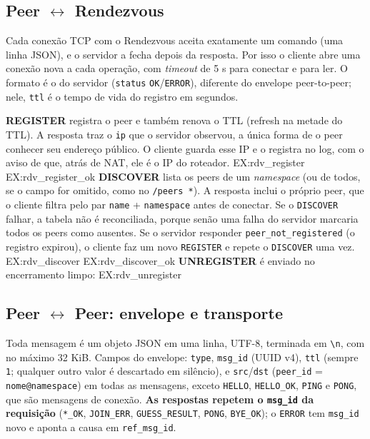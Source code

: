 \documentclass[11pt,a4paper]{article}
\begin{document}
\subsection{Peer \texorpdfstring{$\leftrightarrow$}{<->} Rendezvous}\label{sec:rdv}
Cada conexão TCP com o Rendezvous aceita exatamente um comando (uma linha JSON), e o servidor a fecha depois da resposta. Por isso o cliente abre uma conexão nova a cada operação, com \emph{timeout} de 5 s para conectar e para ler. O formato é o do servidor (\texttt{status} \texttt{OK}/\texttt{ERROR}), diferente do envelope peer-to-peer; nele, \texttt{ttl} é o tempo de vida do registro em segundos.

\textbf{REGISTER} registra o peer e também renova o TTL (refresh na metade do TTL). A resposta traz o \texttt{ip} que o servidor observou, a única forma de o peer conhecer seu endereço público. O cliente guarda esse IP e o registra no log, com o aviso de que, atrás de NAT, ele é o IP do roteador.
{{EX:rdv_register}}
{{EX:rdv_register_ok}}
\textbf{DISCOVER} lista os peers de um \emph{namespace} (ou de todos, se o campo for omitido, como no \texttt{/peers *}). A resposta inclui o próprio peer, que o cliente filtra pelo par \texttt{name} + \texttt{namespace} antes de conectar. Se o \texttt{DISCOVER} falhar, a tabela não é reconciliada, porque senão uma falha do servidor marcaria todos os peers como ausentes. Se o servidor responder \texttt{peer\_not\_registered} (o registro expirou), o cliente faz um novo \texttt{REGISTER} e repete o \texttt{DISCOVER} uma vez.
{{EX:rdv_discover}}
{{EX:rdv_discover_ok}}
\textbf{UNREGISTER} é enviado no encerramento limpo:
{{EX:rdv_unregister}}

\subsection{Peer \texorpdfstring{$\leftrightarrow$}{<->} Peer: envelope e transporte}
Toda mensagem é um objeto JSON em uma linha, UTF-8, terminada em \texttt{\textbackslash n}, com no máximo 32 KiB. Campos do envelope: \texttt{type}, \texttt{msg\_id} (UUID v4), \texttt{ttl} (sempre \texttt{1}; qualquer outro valor é descartado em silêncio), e \texttt{src}/\texttt{dst} (\texttt{peer\_id} = \texttt{nome@namespace}) em todas as mensagens, exceto \texttt{HELLO}, \texttt{HELLO\_OK}, \texttt{PING} e \texttt{PONG}, que são mensagens de conexão. \textbf{As respostas repetem o \texttt{msg\_id} da requisição} (\texttt{*\_OK}, \texttt{JOIN\_ERR}, \texttt{GUESS\_RESULT}, \texttt{PONG}, \texttt{BYE\_OK}); o \texttt{ERROR} tem \texttt{msg\_id} novo e aponta a causa em \texttt{ref\_msg\_id}.
\end{document}
